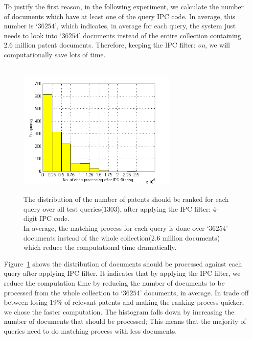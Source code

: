 To justify the first reason, in the following experiment, we calculate the number of documents which have at least one of the query IPC code. In average, this number is `$ 36254 $', which indicates, in average for each query, the system just needs to look into `$ 36254 $' documents instead of the entire collection containing 2.6 million patent documents. Therefore, keeping the IPC filter: \textit{on}, we will computationally save lots of time.  
\begin{figure}[t!]
   \centering
   \includegraphics[width=0.70\textwidth,height=68mm]{figs/ipcfilter-histo.png}
   \caption{The distribution of the number of patents should be ranked for each query over all test queries(1303), after applying the IPC filter: 4-digit IPC code.\\
In average, the matching process for each query is done over  `$ 36254 $' documents instead of the whole collection(2.6 million documents) which reduce the computational time dramatically.}   
   \label{fig:ipcfilter-histo} 
\end{figure}

Figure~\ref{fig:ipcfilter-histo} shows the distribution of documents should be processed against each query after applying IPC filter. It indicates that by applying the IPC filter, we reduce the computation time by reducing the number of documents to be processed from the whole collection to `$ 36254 $' documents, in average. In trade off between losing 19\% of relevant patents and making the ranking process quicker, we chose the faster computation. The histogram falls down by increasing the number of documents that should be processed; This means that the majority of queries need to do matching process with less documents. 
